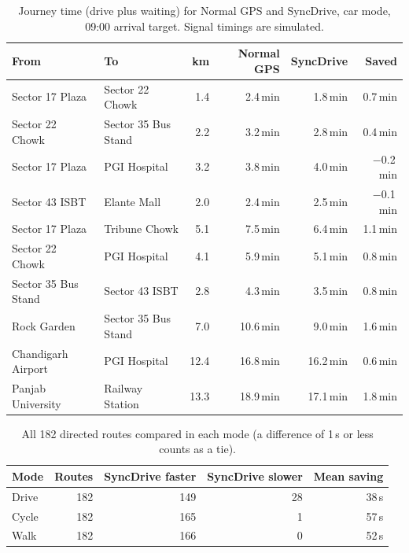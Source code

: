 \documentclass[12pt,a4paper]{report}
\begin{document}
\begin{table}[h]
\centering
\small
\begin{tabular}{llrrrr}
\toprule
\textbf{From} & \textbf{To} & \textbf{km} & \textbf{Normal GPS} & \textbf{SyncDrive} & \textbf{Saved} \\
\midrule
Sector 17 Plaza    & Sector 22 Chowk     & 1.4  & 2.4\,min  & 1.8\,min  & 0.7\,min \\
Sector 22 Chowk    & Sector 35 Bus Stand & 2.2  & 3.2\,min  & 2.8\,min  & 0.4\,min \\
Sector 17 Plaza    & PGI Hospital        & 3.2  & 3.8\,min  & 4.0\,min  & $-$0.2\,min \\
Sector 43 ISBT     & Elante Mall         & 2.0  & 2.4\,min  & 2.5\,min  & $-$0.1\,min \\
Sector 17 Plaza    & Tribune Chowk       & 5.1  & 7.5\,min  & 6.4\,min  & 1.1\,min \\
Sector 22 Chowk    & PGI Hospital        & 4.1  & 5.9\,min  & 5.1\,min  & 0.8\,min \\
Sector 35 Bus Stand& Sector 43 ISBT      & 2.8  & 4.3\,min  & 3.5\,min  & 0.8\,min \\
Rock Garden        & Sector 35 Bus Stand & 7.0  & 10.6\,min & 9.0\,min  & 1.6\,min \\
Chandigarh Airport & PGI Hospital        & 12.4 & 16.8\,min & 16.2\,min & 0.6\,min \\
Panjab University  & Railway Station     & 13.3 & 18.9\,min & 17.1\,min & 1.8\,min \\
\bottomrule
\end{tabular}
\caption{Journey time (drive plus waiting) for Normal GPS and SyncDrive, car
mode, 09:00 arrival target. Signal timings are simulated.}
\end{table}

\begin{table}[h]
\centering
\begin{tabular}{lrrrr}
\toprule
\textbf{Mode} & \textbf{Routes} & \textbf{SyncDrive faster} & \textbf{SyncDrive slower} & \textbf{Mean saving} \\
\midrule
Drive  & 182 & 149 & 28 & 38\,s \\
Cycle  & 182 & 165 & 1  & 57\,s \\
Walk   & 182 & 166 & 0  & 52\,s \\
\bottomrule
\end{tabular}
\caption{All 182 directed routes compared in each mode (a difference of 1\,s
or less counts as a tie).}
\end{table}
\end{document}
